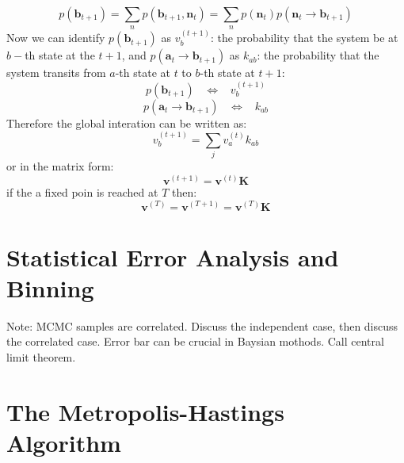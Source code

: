\documentclass{article}
\begin{document}
\begin{equation}
	p(\mathbf{b}_{t+1}) = \sum_{n} p(\mathbf{b}_{t+1}, \mathbf{n}_t) = \sum_{n} p(\mathbf{n}_t)p(\mathbf{n}_t \rightarrow \mathbf{b}_{t+1})  
\end{equation}
Now we can identify $p(\mathbf{b}_{t+1})$ as $v_b^{(t+1)}$: the probability that the system be at $b-$th state at the $t+1$, and $p(\mathbf{a}_t \rightarrow \mathbf{b}_{t+1})$ as $k_{ab}$: the probability that the system transits from $a$-th state at $t$ to $b$-th state at $t+1$:
\[
    p(\mathbf{b}_{t+1})\;\;\; \iff \;\;\;v_b^{(t+1)}
\]
\[
    p(\mathbf{a}_t \rightarrow \mathbf{b}_{t+1})\;\;\; \iff \;\;\;k_{ab}
\]
Therefore the global interation can be written as:
\begin{equation}
	v_b^{(t+1)} = \sum_{j} v_a^{(t)} k_{ab} 
\end{equation}
or in the matrix form:
\begin{equation}
	\mathbf{v}^{(t+1)} = \mathbf{v}^{(t)} \mathbf{K}
\end{equation}
if the a fixed poin is reached at $T$ then:
\begin{equation}
	\mathbf{v}^{(T)} = \mathbf{v}^{(T+1)} = \mathbf{v}^{(T)}\mathbf{K} 
\end{equation}




\section{Statistical Error Analysis and Binning}
Note: MCMC samples are correlated. Discuss the independent case, then discuss the correlated case. Error bar can be crucial in Baysian mothods. Call central limit theorem. 

\section{The Metropolis-Hastings Algorithm}
\end{document}

